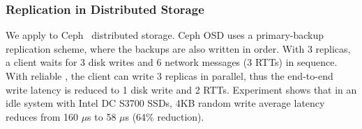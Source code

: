 \subsubsection{Replication in Distributed Storage}
\label{subsec:ceph}

We apply \sys{} to Ceph~\cite{weil2006ceph} distributed storage. Ceph OSD uses a primary-backup replication scheme, where the backups are also written in order. With 3 replicas, a client waits for 3 disk writes and 6 network messages (3 RTTs) in sequence. With reliable \sys{}, the client can write 3 replicas in parallel, thus the end-to-end write latency is reduced to 1 disk write and 2 RTTs. Experiment shows that in an idle system with Intel DC S3700 SSDs, 4KB random write average latency reduces from 160 $\mu$s to 58 $\mu$s (64\% reduction).






